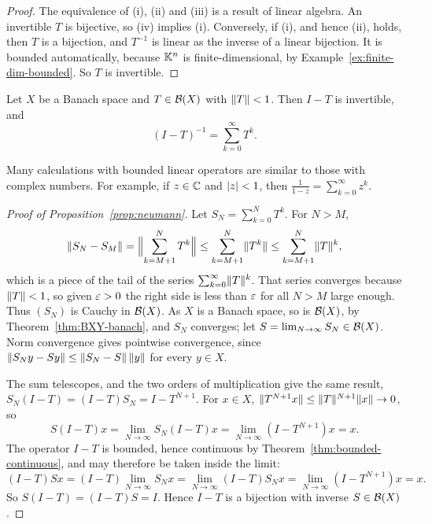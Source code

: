 \begin{proof}
The equivalence of (i), (ii) and (iii) is a result of linear algebra. An
invertible $T$ is bijective, so (iv) implies (i). Conversely, if (i), and
hence (ii), holds, then $T$ is a bijection, and $T^{-1}$ is linear as the
inverse of a linear bijection. It is bounded automatically, because $\mathbb{K}^n$
is finite-dimensional, by Example~\ref{ex:finite-dim-bounded}. So $T$ is
invertible.
\end{proof}

\begin{proposition}\label{prop:neumann}
Let $X$ be a Banach space and $T \in \mathcal{B}(X)$ with $\lVert T\rVert < 1$. Then
$I - T$ is invertible, and
\[
  (I - T)^{-1} = \sum_{k=0}^{\infty} T^k .
\]
\end{proposition}

\begin{remark}
Many calculations with bounded linear operators are similar to those with
complex numbers. For example, if $z \in \mathbb{C}$ and $\lvert z\rvert < 1$, then
$\frac{1}{1-z} = \sum_{k=0}^{\infty} z^k$.
\end{remark}

\begin{proof}[Proof of Proposition~\ref{prop:neumann}]
Let $S_N = \sum_{k=0}^{N} T^k$. For $N > M$,
\[
  \lVert S_N - S_M\rVert
  = \Bigl\lVert \sum_{k=M+1}^{N} T^k \Bigr\rVert
  \le \sum_{k=M+1}^{N} \lVert T^k\rVert
  \le \sum_{k=M+1}^{N} \lVert T\rVert^k ,
\]
which is a piece of the tail of the series $\sum_{k=0}^{\infty} \lVert T\rVert^k$.
That series converges because $\lVert T\rVert < 1$, so given $\varepsilon > 0$ the right
side is less than $\varepsilon$ for all $N > M$ large enough. Thus $(S_N)$ is
Cauchy in $\mathcal{B}(X)$. As $X$ is a Banach space, so is $\mathcal{B}(X)$, by
Theorem~\ref{thm:BXY-banach}, and $S_N$ converges; let
$S = \lim_{N \to \infty} S_N \in \mathcal{B}(X)$. Norm convergence gives
pointwise convergence, since
$\lVert S_N y - S y\rVert \le \lVert S_N - S\rVert\,\lVert y\rVert$ for every $y \in X$.

The sum telescopes, and the two orders of multiplication give the same
result, $S_N(I - T) = (I - T)S_N = I - T^{N+1}$. For $x \in X$,
$\lVert T^{N+1} x\rVert \le \lVert T\rVert^{N+1}\lVert x\rVert \to 0$, so
\[
  S(I-T)x = \lim_{N \to \infty} S_N (I-T) x
  = \lim_{N \to \infty} (I - T^{N+1}) x = x .
\]
The operator $I - T$ is bounded, hence continuous by
Theorem~\ref{thm:bounded-continuous}, and may therefore be taken inside the
limit:
\[
  (I-T)Sx = (I-T)\lim_{N \to \infty} S_N x
  = \lim_{N \to \infty} (I-T)S_N x
  = \lim_{N \to \infty} (I - T^{N+1}) x = x .
\]
So $S(I-T) = (I-T)S = I$. Hence $I - T$ is a bijection with inverse
$S \in \mathcal{B}(X)$.
\end{proof}

